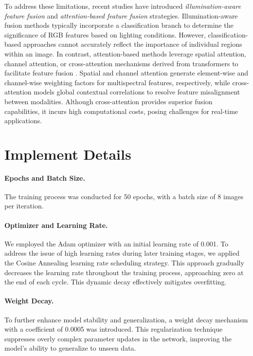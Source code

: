To address these limitations, recent studies have introduced \textit{illumination-aware feature fusion} and \textit{attention-based feature fusion} strategies. Illumination-aware fusion methods \cite{17,21,22,23} typically incorporate a classification branch to determine the significance of RGB features based on lighting conditions. However, classification-based approaches cannot accurately reflect the importance of individual regions within an image. In contrast, attention-based methods leverage spatial attention, channel attention, or cross-attention mechanisms derived from transformers to facilitate feature fusion \cite{9,24,25,26,27,28}. Spatial and channel attention generate element-wise and channel-wise weighting factors for multispectral features, respectively, while cross-attention models global contextual correlations to resolve feature misalignment between modalities. Although cross-attention provides superior fusion capabilities, it incurs high computational costs, posing challenges for real-time applications.




\section{Implement Details}

\paragraph{Epochs and Batch Size.} The training process was conducted for 50 epochs, with a batch size of 8 images per iteration.

\paragraph{Optimizer and Learning Rate.} We employed the Adam optimizer with an initial learning rate of 0.001. To address the issue of high learning rates during later training stages, we applied the Cosine Annealing learning rate scheduling strategy. This approach gradually decreases the learning rate throughout the training process, approaching zero at the end of each cycle. This dynamic decay effectively mitigates overfitting.

\paragraph{Weight Decay.} To further enhance model stability and generalization, a weight decay mechanism with a coefficient of 0.0005 was introduced. This regularization technique suppresses overly complex parameter updates in the network, improving the model’s ability to generalize to unseen data.
	
